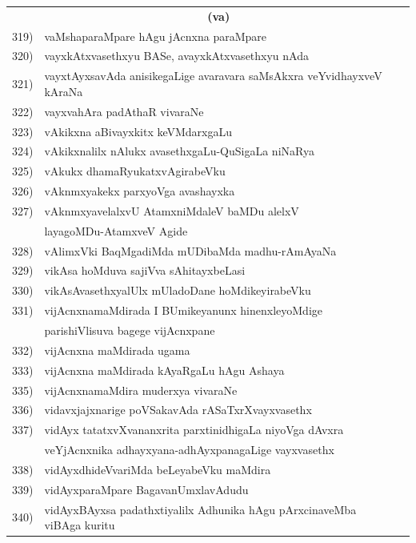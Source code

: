 \begin{longtable}{@{}cp{7.4cm}r}
     & \multicolumn{1}{c}{\textbf{(va)}} & \\[0.3cm]
319) & vaMshaparaMpare hAgu jAcnxna paraMpare &  \pageref{page139a}\\
320) & vayxkAtxvasethxyu BASe, avayxkAtxvasethxyu nAda & \pageref{page8b}\\
321) & vayxtAyxsavAda anisikegaLige avaravara saMsAkxra veYvidhayxveV kAraNa & \pageref{page176}\\
322) & vayxvahAra padAthaR vivaraNe & \pageref{page223a}\\  
323) & vAkikxna aBivayxkitx keVMdarxgaLu & \pageref{page8a}\\
324) & vAkikxnalilx nAlukx avasethxgaLu-QuSigaLa niNaRya & \pageref{page8}\\
325) & vAkukx dhamaRyukatxvAgirabeVku & \pageref{page110a}\\
326) & vAknmxyakekx parxyoVga avashayxka & \pageref{page110}\\
327) & vAknmxyavelalxvU AtamxniMdaleV baMDu alelxV  & \\
     & layagoMDu-AtamxveV Agide & \pageref{page195}\\
328) & vAlimxVki BaqMgadiMda mUDibaMda madhu-rAmAyaNa & \pageref{page238a}\\
329)  & vikAsa hoMduva sajiVva sAhitayxbeLasi & \pageref{page79c}\\ 
330) & vikAsAvasethxyalUlx mUladoDane hoMdikeyirabeVku & \pageref{page178}\\
331) & vijAcnxnamaMdirada I BUmikeyanunx hinenxleyoMdige  & \\
     & parishiVlisuva bagege vijAcnxpane & \pageref{page29a}\\
332) & vijAcnxna maMdirada ugama & \pageref{page65}\\
333) & vijAcnxna maMdirada kAyaRgaLu hAgu Ashaya & \pageref{page22a}\\ 
335) & vijAcnxnamaMdira muderxya vivaraNe & \pageref{page71}\\ 
336) & vidavxjajxnarige poVSakavAda rASaTxrXvayxvasethx & \pageref{page46a}\\
337) & vidAyx tatatxvXvananxrita parxtinidhigaLa niyoVga dAvxra & \\
     & veYjAcnxnika adhayxyana-adhAyxpanagaLige vayxvasethx & \pageref{page55}\\
338) & vidAyxdhideVvariMda beLeyabeVku maMdira & \pageref{page66b}\\
339) & vidAyxparaMpare BagavanUmxlavAdudu & \pageref{page70b}\\
340) & vidAyxBAyxsa padathxtiyalilx Adhunika hAgu pArxcinaveMba viBAga kuritu & \pageref{page38a}\\

\end{longtable}
